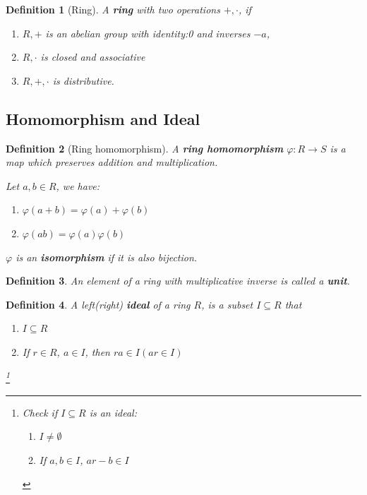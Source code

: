 \documentclass[12pt]{article}
\newtheorem{definition}{Definition}[subsection]
\begin{document}
		\begin{definition}[Ring]
			A \textbf{ring} with two operations $+, \cdot$, if 
			\begin{enumerate}
				\item $R, +$ is an abelian group with identity:0 and inverses $-a$,
				\item $R, \cdot$ is closed and associative
				\item $R, +, \cdot$ is distributive.
			\end{enumerate}
		\end{definition}
		
		\subsection{Homomorphism and Ideal}
		\begin{definition}[Ring homomorphism]
			A \textbf{ring homomorphism} $\varphi: R \rightarrow S$ is a map which preserves addition and multiplication.
			
			Let $a, b \in R$, we have:
			\begin{enumerate}
				\item $\varphi(a + b) = \varphi(a) + \varphi(b)$
				\item $\varphi(ab) = \varphi(a)\varphi(b)$
			\end{enumerate}
			
			$\varphi$ is an \textbf{isomorphism} if it is also bijection.
		\end{definition}
		
		\begin{definition}
			An element of a ring with multiplicative inverse is called a \textbf{unit}.
		\end{definition}
		
		\begin{definition}
			A left(right) \textbf{ideal} of a ring $R$, is a subset $I \subseteq R$ that 
			\begin{enumerate}
				\item $I \subseteq R$
				\item If $r \in R$, $a \in I$, then $ra \in I(ar \in I)$
			\end{enumerate}
			\footnote{Check if $I \subseteq R$ is an ideal: \begin{enumerate}
				\item $I \neq \emptyset$
				\item If $a, b \in I$, $ar - b \in I$
			\end{enumerate}}
		\end{definition}
		
\end{document}
